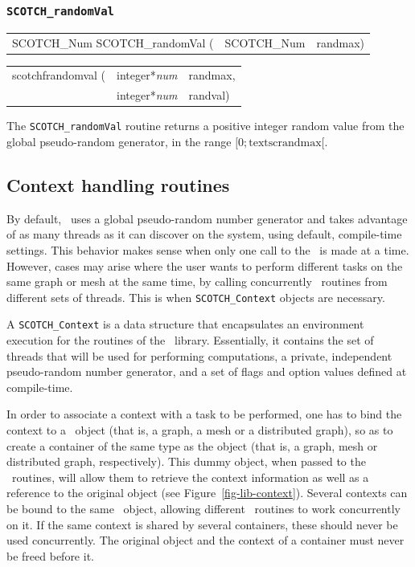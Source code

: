 \subsubsection{{\tt SCOTCH\_randomVal}}

\begin{itemize}
\progsyn

{\tt\begin{tabular}{l@{}ll}
SCOTCH\_Num SCOTCH\_randomVal ( & SCOTCH\_Num & randmax)
\end{tabular}}

{\tt\begin{tabular}{l@{}ll}
scotchfrandomval ( & integer*{\it num} & randmax, \\
                   & integer*{\it num} & randval)
\end{tabular}}

\progdes

The {\tt SCOTCH\_randomVal} routine returns a positive integer random
value from the global pseudo-random generator, in the range
$[0;\mbox{textsc{randmax}}[$.
\end{itemize}

\subsection{Context handling routines}
\label{sec-lib-context}

By default, \scotch\ uses a global pseudo-random number generator and
takes advantage of as many threads as it can discover on the system,
using default, compile-time settings. This behavior makes sense when
only one call to the \libscotch\ is made at a time. However, cases may
arise where the user wants to perform different tasks on the same
graph or mesh at the same time, by calling concurrently
\libscotch\ routines from different sets of threads. This is when
\texttt{SCOTCH\_\lbt Context} objects are necessary.

A \texttt{SCOTCH\_\lbt Context} is a data structure that encapsulates
an environment execution for the routines of the
\libscotch\ library. Essentially, it contains the set of threads that
will be used for performing computations, a private, independent
pseudo-random number generator, and a set of flags and option values
defined at compile-time.

In order to associate a context with a task to be performed, one has
to bind the context to a \scotch\ object (that is, a graph, a mesh or
a distributed graph), so as to create a container of the same type as
the object (that is, a graph, mesh or distributed graph,
respectively). This dummy object, when passed to the
\libscotch\ routines, will allow them to retrieve the context
information as well as a reference to the original object (see
Figure~\ref{fig-lib-context}). Several contexts can be bound to the
same \scotch\ object, allowing different \libscotch\ routines to work
concurrently on it. If the same context is shared by several
containers, these should never be used concurrently. The original
object and the context of a container must never be freed before it.

